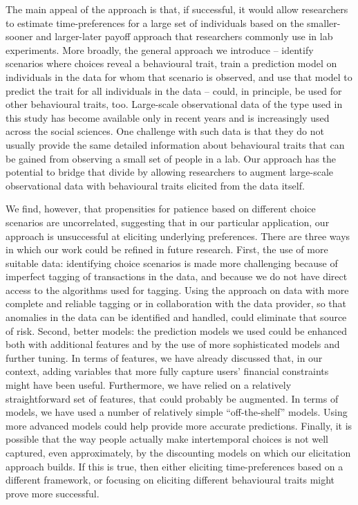 The main appeal of the approach is that, if successful, it would allow
researchers to estimate time-preferences for a large set of individuals based
on the smaller-sooner and larger-later payoff approach that researchers
commonly use in lab experiments. More broadly, the general approach we
introduce -- identify scenarios where choices reveal a behavioural
trait, train a prediction model on individuals in the data for whom that
scenario is observed, and use that model to predict the trait for all
individuals in the data -- could, in principle, be used for other behavioural
traits, too. Large-scale observational data of the type used in this study has
become available only in recent years and is increasingly used across the
social sciences. One challenge with such data is that they do not usually
provide the same detailed information about behavioural traits that can be gained
from observing a small set of people in a lab. Our approach has the potential
to bridge that divide by allowing researchers to augment large-scale
observational data with behavioural traits elicited from the data itself.

We find, however, that propensities for patience based on different choice
scenarios are uncorrelated, suggesting that in our particular application, our
approach is unsuccessful at eliciting underlying preferences. There are three
ways in which our work could be refined in future research. First, the use of more suitable data: identifying
choice scenarios is made more challenging because of imperfect tagging of
transactions in the data, and because we do not have direct access to the
algorithms used for tagging. Using the approach on data with more complete and
reliable tagging or in collaboration with the data provider, so that anomalies
in the data can be identified and handled, could eliminate that source of risk.
Second, better models: the prediction models we used could be enhanced both with additional
features and by the use of more sophisticated models and further tuning. In
terms of features, we have already discussed that, in our context, adding
variables that more fully capture users' financial constraints might have been
useful. Furthermore, we have relied on a relatively straightforward set of
features, that could probably be augmented. In terms of models, we have used a
number of relatively simple ``off-the-shelf'' models. Using more advanced
models could help provide more accurate predictions. Finally, it is possible
that the way people actually make intertemporal choices is not well
captured, even approximately, by the discounting models on which our
elicitation approach builds. If this is true, then either eliciting
time-preferences based on a different framework, or focusing on eliciting
different behavioural traits might prove more successful.

